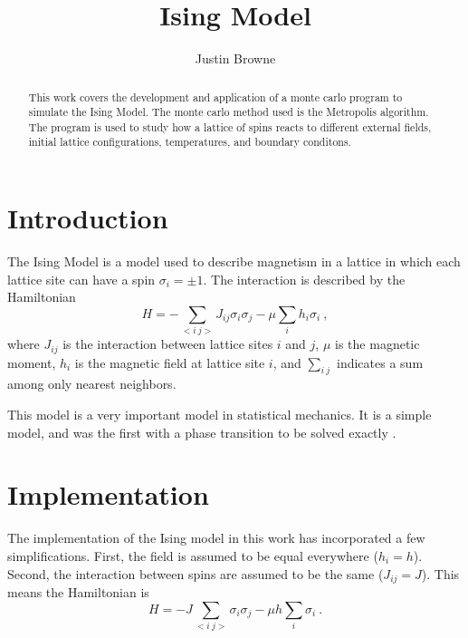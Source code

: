 \documentclass[]{article}
\begin{document}
\title{Ising Model}
\author{Justin Browne}
\date{}
\maketitle

\begin{abstract}
This work covers the development and application of a monte carlo program to simulate the Ising Model. The monte carlo method used is the Metropolis algorithm. The program is used to study how a lattice of spins reacts to different external fields, initial lattice configurations, temperatures, and boundary conditons.
\end{abstract}

\section{Introduction}
The Ising Model is a model used to describe magnetism in a lattice in which each lattice site can have a spin $\sigma_{i} = \pm 1$.
The interaction is described by the Hamiltonian
\[
H = - \sum_{<i~j>} J_{ij} \sigma_i \sigma_j -\mu \sum_{i} h_i \sigma_i ~,
\]
where $J_{ij}$ is the interaction between lattice sites $i$ and $j$, $\mu$ is the magnetic moment, $h_{i}$ is the magnetic field at lattice site $i$, and $\sum_{i~j}$ indicates a sum among only nearest neighbors.

This model is a very important model in statistical mechanics. It is a simple model, and was the first with a phase transition to be solved exactly \cite{mccoy2012}.

\section{Implementation}
The implementation of the Ising model in this work has incorporated a few simplifications.
First, the field is assumed to be equal everywhere ($h_{i} = h$).
Second, the interaction between spins are assumed to be the same ($J_{ij} = J$). This means the Hamiltonian is
\[
H = - J \sum_{<i~j>} \sigma_i \sigma_j -\mu h \sum_{i} \sigma_i ~.
\]
\end{document}
